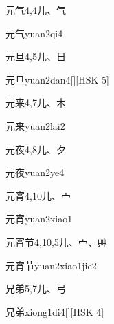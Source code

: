\begin{entry}{元气}{4,4}{⼉、⽓}
  \begin{phonetics}{元气}{yuan2qi4}
  \end{phonetics}
\end{entry}

\begin{entry}{元旦}{4,5}{⼉、⽇}
  \begin{phonetics}{元旦}{yuan2dan4}[][HSK 5]
  \end{phonetics}
\end{entry}

\begin{entry}{元来}{4,7}{⼉、⽊}
  \begin{phonetics}{元来}{yuan2lai2}
  \end{phonetics}
\end{entry}

\begin{entry}{元夜}{4,8}{⼉、⼣}
  \begin{phonetics}{元夜}{yuan2ye4}
  \end{phonetics}
\end{entry}

\begin{entry}{元宵}{4,10}{⼉、⼧}
  \begin{phonetics}{元宵}{yuan2xiao1}
  \end{phonetics}
\end{entry}

\begin{entry}{元宵节}{4,10,5}{⼉、⼧、⾋}
  \begin{phonetics}{元宵节}{yuan2xiao1jie2}
  \end{phonetics}
\end{entry}

\begin{entry}{兄弟}{5,7}{⼉、⼸}
  \begin{phonetics}{兄弟}{xiong1di4}[][HSK 4]
  \end{phonetics}
\end{entry}

